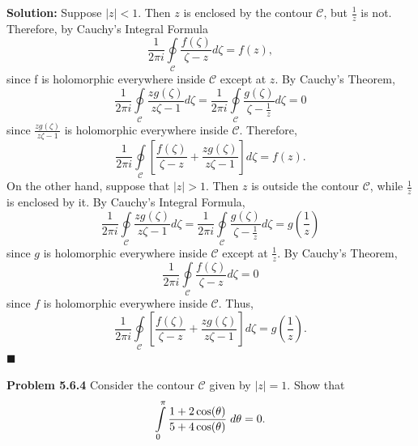 \documentclass{article}
\newcommand{\mybox}{%
    \collectbox{%
        \setlength{\fboxsep}{1pt}%
        \fbox{\BOXCONTENT}%
    }%
}
\begin{document}
\vspace{5mm}

\noindent\mybox{\textbf{Solution:}}  Suppose $|z| < 1$.  Then $z$ is enclosed by the contour $\mathscr{C}$, but $\frac{1}{z}$ is not.  Therefore, by Cauchy's Integral Formula
$$\frac{1}{2\pi i}\oint\limits_{\mathscr{C}}\frac{f(\zeta)}{\zeta - z} d\zeta = f(z),$$ since f is holomorphic everywhere inside $\mathscr{C}$ except at $z$. By Cauchy's Theorem, $$\frac{1}{2\pi i}\oint\limits_{\mathscr{C}}\frac{zg(\zeta)}{z\zeta - 1} d\zeta = \frac{1}{2\pi i}\oint\limits_{\mathscr{C}}\frac{g(\zeta)}{\zeta - \frac{1}{z}} d\zeta = 0$$
since $\frac{zg(\zeta)}{z\zeta - 1}$ is holomorphic everywhere inside $\mathscr{C}$.  Therefore,
$$
\frac{1}{2\pi i}\oint\limits_{\mathscr{C}}\left[\frac{f(\zeta)}{\zeta - z} + \frac{zg(\zeta)}{z\zeta - 1}\right] d\zeta = f(z).
$$
On the other hand, suppose that $|z| > 1$. Then $z$ is outside the contour $\mathscr{C}$, while $\frac{1}{z}$ is enclosed by it.  By Cauchy's Integral Formula, 
$$\frac{1}{2\pi i}\oint\limits_{\mathscr{C}}\frac{zg(\zeta)}{z\zeta - 1} d\zeta = \frac{1}{2\pi i}\oint\limits_{\mathscr{C}}\frac{g(\zeta)}{\zeta - \frac{1}{z}} d\zeta = g\left(\frac{1}{z}\right) 
$$
since $g$ is holomorphic everywhere inside $\mathscr{C}$ except at $\frac{1}{z}$.  By Cauchy's Theorem, 
$$
\frac{1}{2\pi i}\oint\limits_{\mathscr{C}}\frac{f(\zeta)}{\zeta - z} d\zeta = 0
$$
since $f$ is holomorphic everywhere inside $\mathscr{C}$.  Thus, 
$$\frac{1}{2\pi i}\oint\limits_{\mathscr{C}}\left[\frac{f(\zeta)}{\zeta - z} + \frac{zg(\zeta)}{z\zeta - 1}\right] d\zeta = g\left(\frac{1}{z}\right).
$$
\hfill$\blacksquare$

\pagebreak

\noindent\mybox{\textbf{Problem 5.6.4}}  Consider the contour $\mathscr{C}$ given by $|z| = 1$.  Show that $$\int\limits_0^{\pi} \frac{1+2\cos(\theta)}{5+4\cos(\theta)} \hspace{1mm} d\theta = 0.$$

\vspace{5mm}
\end{document}
